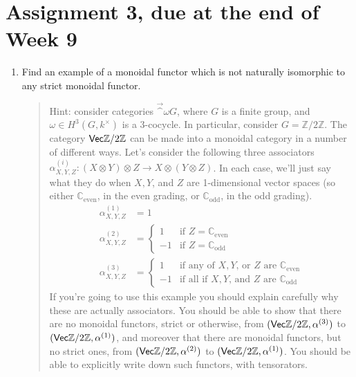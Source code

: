 \documentclass[12pt]{amsart}
\begin{document}
\section{Assignment 3, due at the end of Week 9}
\begin{enumerate}


\item Find an example of a monoidal functor which is not naturally isomorphic to any strict monoidal functor.


\begin{quote}
\scriptsize
Hint: consider categories $\Vec^\omega G$, where $G$ is a finite group, and $\omega \in H^3(G, k^\times)$ is a 3-cocycle. In particular, consider $G = \mathbb Z / 2 \mathbb Z$. The category $\Vec \mathbb Z / 2 \mathbb Z$ can be made into a monoidal category in 
a number of different ways. Let's consider the following three associators $\alpha^{(i)}_{X,Y,Z} : (X \otimes Y) \otimes Z \to X \otimes (Y \otimes Z)$. In each case, we'll just say what they do when $X, Y$, and $Z$ are 1-dimensional vector spaces (so either $\mathbb C_{\text{even}}$, in the even grading, or $\mathbb C_{\text{odd}}$, in the odd grading).
\begin{align*}
\alpha^{(1)}_{X,Y,Z} & = 1 \\
\alpha^{(2)}_{X,Y,Z} & = \begin{cases} 1 & \text{if $Z = \mathbb C_{\text{even}}$} \\ -1 & \text{if $Z = \mathbb C_{\text{odd}}$} \end{cases} \\
\alpha^{(3)}_{X,Y,Z} & = \begin{cases} 1 & \text{if any of $X, Y$, or $Z$ are $\mathbb C_{\text{even}}$} \\ -1 & \text{if all if $X, Y$, and $Z$ are $\mathbb C_{\text{odd}}$} \end{cases}
\end{align*}
If you're going to use this example you should explain carefully why these are actually associators. You should be able to show that there are 
no monoidal functors, strict or otherwise, from $(\Vec \mathbb Z / 2 \mathbb Z, \alpha^{(3)})$ to $(\Vec \mathbb Z / 2 \mathbb Z, \alpha^{(1)})$, and moreover
that there are monoidal functors, but no strict ones, from $(\Vec \mathbb Z / 2 \mathbb Z, \alpha^{(2)})$ to $(\Vec \mathbb Z / 2 \mathbb Z, \alpha^{(1)})$.
You should be able to explicitly write down such functors, with tensorators.


\end{quote}
\end{enumerate}
\end{document}
